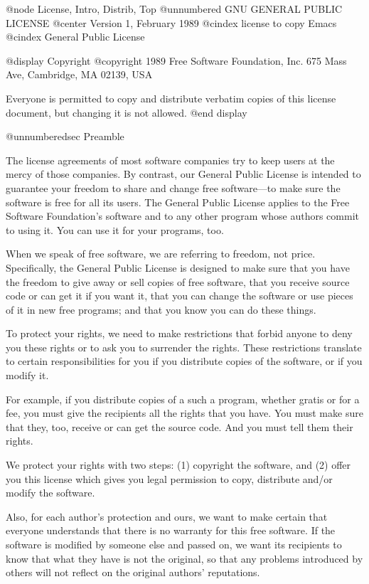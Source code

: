 @node License, Intro, Distrib, Top
@unnumbered GNU GENERAL PUBLIC LICENSE
@center Version 1, February 1989
@cindex license to copy Emacs
@cindex General Public License

@display
Copyright @copyright{} 1989 Free Software Foundation, Inc.
675 Mass Ave, Cambridge, MA 02139, USA

Everyone is permitted to copy and distribute verbatim copies
of this license document, but changing it is not allowed.
@end display

@unnumberedsec Preamble

  The license agreements of most software companies try to keep users
at the mercy of those companies.  By contrast, our General Public
License is intended to guarantee your freedom to share and change free
software---to make sure the software is free for all its users.  The
General Public License applies to the Free Software Foundation's
software and to any other program whose authors commit to using it.
You can use it for your programs, too.

  When we speak of free software, we are referring to freedom, not
price.  Specifically, the General Public License is designed to make
sure that you have the freedom to give away or sell copies of free
software, that you receive source code or can get it if you want it,
that you can change the software or use pieces of it in new free
programs; and that you know you can do these things.

  To protect your rights, we need to make restrictions that forbid
anyone to deny you these rights or to ask you to surrender the rights.
These restrictions translate to certain responsibilities for you if you
distribute copies of the software, or if you modify it.

  For example, if you distribute copies of a such a program, whether
gratis or for a fee, you must give the recipients all the rights that
you have.  You must make sure that they, too, receive or can get the
source code.  And you must tell them their rights.

  We protect your rights with two steps: (1) copyright the software, and
(2) offer you this license which gives you legal permission to copy,
distribute and/or modify the software.

  Also, for each author's protection and ours, we want to make certain
that everyone understands that there is no warranty for this free
software.  If the software is modified by someone else and passed on, we
want its recipients to know that what they have is not the original, so
that any problems introduced by others will not reflect on the original
authors' reputations.

